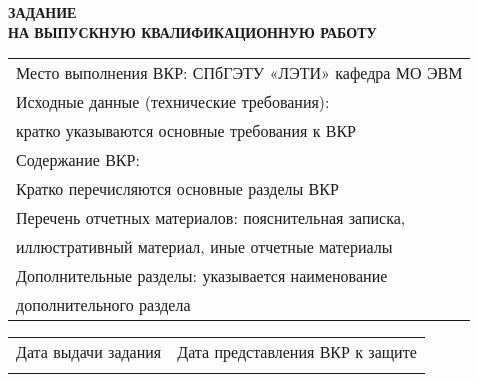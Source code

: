\begin{center}
	\textbf{
		ЗАДАНИЕ \\
		НА ВЫПУСКНУЮ КВАЛИФИКАЦИОННУЮ РАБОТУ
	}

	\vspace*{2cm}

	\confirmation

	\vspace*{3cm}
	
	\worktitle
	\begin{tabularx}{\textwidth}{ X }
		Место выполнения ВКР: СПбГЭТУ «ЛЭТИ» кафедра МО ЭВМ \\
		Исходные данные (технические требования): \\
		кратко указываются основные требования к ВКР \\
		Содержание ВКР: \\
		Кратко перечисляются основные разделы ВКР \\
		Перечень отчетных материалов: пояснительная записка, \\ иллюстративный материал, иные отчетные материалы \\
		Дополнительные разделы: указывается наименование \\ дополнительного раздела
	\end{tabularx}

	\vspace*{2cm}
	
	\begin{tabularx}{\textwidth}{ X X }
		Дата выдачи задания & Дата представления ВКР к защите \\
		\emptydate & \emptydate
	\end{tabularx}

	\vspace*{3cm}

	\subsblock
\end{center}

\thispagestyle{empty}
\clearpage
